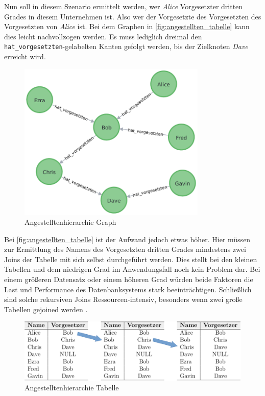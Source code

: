Nun soll in diesem Szenario ermittelt werden, wer \textit{Alice} Vorgesetzter dritten Grades in diesem Unternehmen ist. Also wer der Vorgesetzte des Vorgesetzten des Vorgesetzten von \textit{Alice} ist. Bei dem Graphen in \autoref{fig:angestellten_tabelle} kann dies leicht nachvollzogen werden. Es muss lediglich dreimal den \texttt{hat\_vorgesetzten}-gelabelten Kanten gefolgt werden, bis der Zielknoten \textit{Dave} erreicht wird. 

\begin{figure}[ht]
    \centering
    \includegraphics[width=0.8\textwidth]{images/angestellten_graph.pdf}
    \caption{Angestelltenhierarchie Graph}
    \label{fig:angestellten_graph}
\end{figure}

Bei \autoref{fig:angestellten_tabelle} ist der Aufwand jedoch etwas höher. Hier müssen zur Ermittlung des Namens des Vorgesetzten dritten Grades mindestens zwei Joins der Tabelle mit sich selbst durchgeführt werden. Dies stellt bei den kleinen Tabellen und dem niedrigen Grad im Anwendungsfall noch kein Problem dar. Bei einem größeren Datensatz oder einem höheren Grad würden beide Faktoren die Last und Performance des Datenbanksystems stark beeinträchtigen. Schließlich sind solche rekursiven Joins Ressourcen-intensiv, besonders wenn zwei große Tabellen gejoined werden \cite{gdbms}. 

\begin{figure}[ht]
    \centering
    \includegraphics[width=\textwidth]{images/angestellte_tabellen.pdf}
    \caption{Angestelltenhierarchie Tabelle}
    \label{fig:angestellten_tabelle}
\end{figure}

